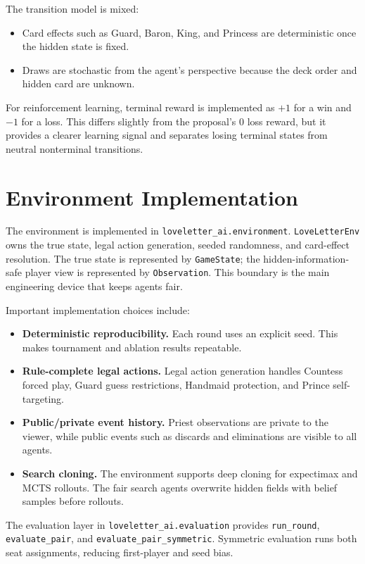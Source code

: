 \documentclass[10pt,twocolumn]{article}
\begin{document}
The transition model is mixed:
\begin{itemize}
    \item Card effects such as Guard, Baron, King, and Princess are
    deterministic once the hidden state is fixed.
    \item Draws are stochastic from the agent's perspective because the deck
    order and hidden card are unknown.
\end{itemize}
For reinforcement learning, terminal reward is implemented as $+1$ for a win
and $-1$ for a loss. This differs slightly from the proposal's $0$ loss
reward, but it provides a clearer learning signal and separates losing
terminal states from neutral nonterminal transitions.

\section{Environment Implementation}

The environment is implemented in \texttt{loveletter\_ai.environment}.
\texttt{LoveLetterEnv} owns the true state, legal action generation, seeded
randomness, and card-effect resolution. The true state is represented by
\texttt{GameState}; the hidden-information-safe player view is represented by
\texttt{Observation}. This boundary is the main engineering device that keeps
agents fair.

Important implementation choices include:
\begin{itemize}
    \item \textbf{Deterministic reproducibility.} Each round uses an explicit
    seed. This makes tournament and ablation results repeatable.
    \item \textbf{Rule-complete legal actions.} Legal action generation handles
    Countess forced play, Guard guess restrictions, Handmaid protection, and
    Prince self-targeting.
    \item \textbf{Public/private event history.} Priest observations are
    private to the viewer, while public events such as discards and
    eliminations are visible to all agents.
    \item \textbf{Search cloning.} The environment supports deep cloning for
    expectimax and MCTS rollouts. The fair search agents overwrite hidden
    fields with belief samples before rollouts.
\end{itemize}

The evaluation layer in \texttt{loveletter\_ai.evaluation} provides
\texttt{run\_round}, \texttt{evaluate\_pair}, and
\texttt{evaluate\_pair\_symmetric}. Symmetric evaluation runs both seat
assignments, reducing first-player and seed bias.
\end{document}
